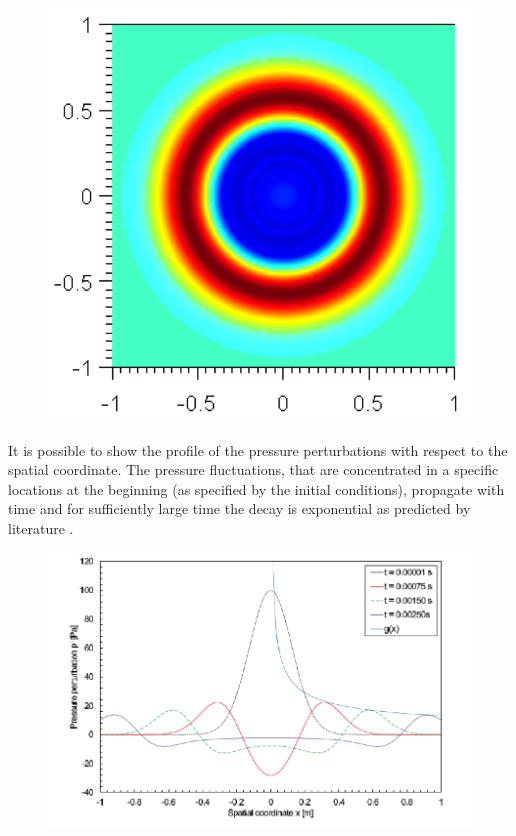 \begin{figure}
	\includegraphics{Figures/Prop_3.png}
\end{figure}

It is possible to show the profile of the pressure perturbations with respect to
the spatial coordinate. The pressure fluctuations, that are concentrated  in a
specific locations at the beginning (as specified by the initial conditions),
propagate with time and for sufficiently large time the decay is exponential as
predicted by literature \cite{DoFf83}.

\begin{figure}
	\includegraphics{Figures/prog_4.png}
\end{figure}


